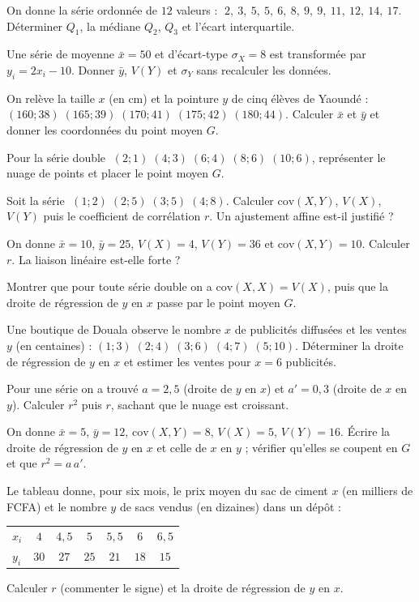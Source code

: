 \exo{} On donne la série ordonnée de $12$ valeurs :
$\;2,\ 3,\ 5,\ 5,\ 6,\ 8,\ 9,\ 9,\ 11,\ 12,\ 14,\ 17$.
Déterminer $Q_1$, la médiane $Q_2$, $Q_3$ et l'écart interquartile.

\exo{} Une série de moyenne $\bar x=50$ et d'écart-type $\sigma_X=8$ est transformée
par $y_i=2x_i-10$. Donner $\bar y$, $V(Y)$ et $\sigma_Y$ sans recalculer les données.


\exo{} On relève la taille $x$ (en $\mathrm{cm}$) et la pointure $y$ de cinq élèves de
Yaoundé : $(160;38)\;(165;39)\;(170;41)\;(175;42)\;(180;44)$. Calculer $\bar x$ et $\bar y$ et
donner les coordonnées du point moyen $G$.

\exo{} Pour la série double $\;(2;1)\;(4;3)\;(6;4)\;(8;6)\;(10;6)$, représenter le nuage
de points et placer le point moyen $G$.


\exo{} Soit la série $\;(1;2)\;(2;5)\;(3;5)\;(4;8)$. Calculer $\mathrm{cov}(X,Y)$,
$V(X)$, $V(Y)$ puis le coefficient de corrélation $r$. Un ajustement affine est-il justifié ?

\exo{} On donne $\bar x=10$, $\bar y=25$, $V(X)=4$, $V(Y)=36$ et
$\mathrm{cov}(X,Y)=10$. Calculer $r$. La liaison linéaire est-elle forte ?

\exo{} Montrer que pour toute série double on a $\mathrm{cov}(X,X)=V(X)$, puis que la
droite de régression de $y$ en $x$ passe par le point moyen $G$.


\exo{} Une boutique de Douala observe le nombre $x$ de publicités diffusées et les
ventes $y$ (en centaines) : $(1;3)\;(2;4)\;(3;6)\;(4;7)\;(5;10)$. Déterminer la droite de
régression de $y$ en $x$ et estimer les ventes pour $x=6$ publicités.

\exo{} Pour une série on a trouvé $a=2{,}5$ (droite de $y$ en $x$) et $a'=0{,}3$
(droite de $x$ en $y$). Calculer $r^2$ puis $r$, sachant que le nuage est croissant.

\exo{} On donne $\bar x=5$, $\bar y=12$, $\mathrm{cov}(X,Y)=8$, $V(X)=5$, $V(Y)=16$.
Écrire la droite de régression de $y$ en $x$ et celle de $x$ en $y$ ; vérifier qu'elles se
coupent en $G$ et que $r^2=a\,a'$.

\exo{} Le tableau donne, pour six mois, le prix moyen du sac de ciment $x$ (en
milliers de FCFA) et le nombre $y$ de sacs vendus (en dizaines) dans un dépôt :
\begin{center}\small
\begin{tabular}{@{}lcccccc@{}}
\toprule
$x_i$ & $4$ & $4{,}5$ & $5$ & $5{,}5$ & $6$ & $6{,}5$\\
$y_i$ & $30$ & $27$ & $25$ & $21$ & $18$ & $15$\\
\bottomrule
\end{tabular}
\end{center}
Calculer $r$ (commenter le signe) et la droite de régression de $y$ en $x$.


